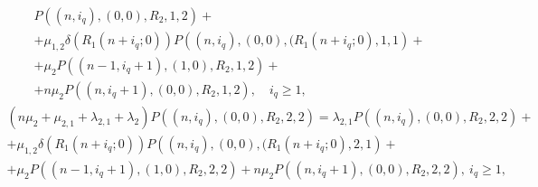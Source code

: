 {\begin{multline}
  P\left((n,i_q),(0,0),R_2,1,2\right)+ \\+ 
  \mu_{1,2}\delta\left(R_1(n+i_q;0)\right)
  P\left((n,i_q),(0,0),(R_1(n+i_q;0),1,1\right)+\\ +
  \mu_2 P\left((n-1,i_q+1),(1,0),R_2,1,2\right)+ \\+ n\mu_2
  P\left((n,i_q+1),(0,0),R_2,1,2\right), \quad i_q\geqslant 1,
\label{eq:4.3}
\end{multline}
\begin{multline}
  \left(n\mu_2+\mu_{2,1}+\lambda_{2,1}+\lambda_2\right)
  P\left((n,i_q),(0,0),R_2,2,2\right) =  \lambda_{2,1}
  P\left((n,i_q),(0,0),R_2,2,2\right)+ \\ +
  \mu_{1,2}\delta\left(R_1(n+i_q;0)\right)
  P\left((n,i_q),(0,0),(R_1(n+i_q;0),2,1\right)+\\ +
  \mu_2 P\left((n-1,i_q+1),(1,0),R_2,2,2\right)+ n\mu_2
  P\left((n,i_q+1),(0,0),R_2,2,2\right), \ i_q\geqslant 1,
\label{eq:4.4}
\end{multline}

}
